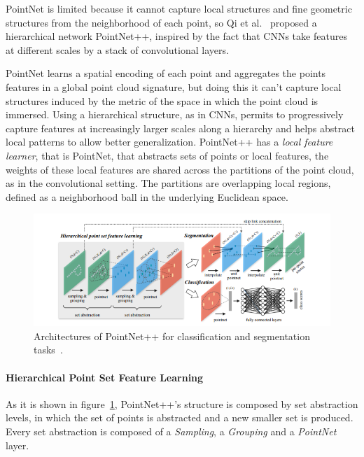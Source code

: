 PointNet is limited because it cannot capture local structures and fine geometric structures from the neighborhood of each point, so Qi et al.~\cite{qi2017pointnet++} proposed a hierarchical network PointNet++, inspired by the fact that CNNs take features at different scales by a stack of convolutional layers.

PointNet learns a spatial encoding of each point and aggregates the points features in a global point cloud signature, but doing this it can't capture local structures induced by the metric of the space in which the point cloud is immersed. Using a hierarchical structure, as in CNNs, permits to progressively capture features at increasingly larger scales along a hierarchy and helps abstract local patterns to allow better generalization. PointNet++ has a \textit{local feature learner}, that is PointNet, that abstracts sets of points or local features, the weights of these local features are shared across the partitions of the point cloud, as in the convolutional setting. The partitions are overlapping local regions, defined as a neighborhood ball in the underlying Euclidean space.

\begin{figure}[ht]
    \centering
    \includegraphics[width=\textwidth]{images/pointnet++_architecture.png}
    \caption{Architectures of PointNet++ for classification and segmentation tasks~\cite{qi2017pointnet++}.}
    \label{fig:pointnet++_architecture}
\end{figure}

\paragraph{Hierarchical Point Set Feature Learning}

As it is shown in figure~\ref{fig:pointnet++_architecture}, PointNet++'s structure is composed by set abstraction levels, in which the set of points is abstracted and a new smaller set is produced. Every set abstraction is composed of a \textit{Sampling}, a \textit{Grouping} and a \textit{PointNet} layer.

